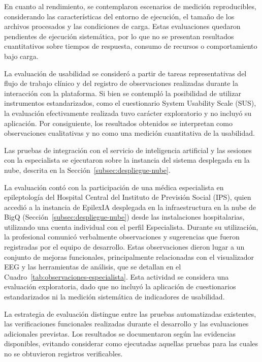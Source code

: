 En cuanto al rendimiento, se contemplaron escenarios de medición reproducibles, considerando las características del entorno de ejecución, el tamaño de los archivos procesados y las condiciones de carga. Estas evaluaciones quedaron pendientes de ejecución sistemática, por lo que no se presentan resultados cuantitativos sobre tiempos de respuesta, consumo de recursos o comportamiento bajo carga.


La evaluación de usabilidad se consideró a partir de tareas representativas del flujo de trabajo clínico y del registro de observaciones realizadas durante la interacción con la plataforma. Si bien se contempló la posibilidad de utilizar instrumentos estandarizados, como el cuestionario System Usability Scale (SUS), la evaluación efectivamente realizada tuvo carácter exploratorio y no incluyó su aplicación. Por consiguiente, los resultados obtenidos se interpretan como observaciones cualitativas y no como una medición cuantitativa de la usabilidad.


Las pruebas de integración con el servicio de inteligencia artificial y las sesiones con la especialista se ejecutaron sobre la instancia del sistema desplegada en la nube, descrita en la Sección~\ref{subsec:despliegue-nube}.

La evaluación contó con la participación de una médica especialista en epileptología del Hospital Central del Instituto de Previsión Social (IPS), quien accedió a la instancia de EpilexIA desplegada en la infraestructura en la nube de BigQ (Sección~\ref{subsec:despliegue-nube}) desde las instalaciones hospitalarias, utilizando una cuenta individual con el perfil Especialista. Durante su utilización, la profesional comunicó verbalmente observaciones y sugerencias que fueron registradas por el equipo de desarrollo. Estas observaciones dieron lugar a un conjunto de mejoras funcionales, principalmente relacionadas con el visualizador EEG y las herramientas de análisis, que se detallan en el Cuadro~\ref{tab:observaciones-especialista}. Esta actividad se considera una evaluación exploratoria, dado que no incluyó la aplicación de cuestionarios estandarizados ni la medición sistemática de indicadores de usabilidad.


La estrategia de evaluación distingue entre las pruebas automatizadas existentes, las verificaciones funcionales realizadas durante el desarrollo y las evaluaciones adicionales previstas. Los resultados se documentaron según las evidencias disponibles, evitando considerar como ejecutadas aquellas pruebas para las cuales no se obtuvieron registros verificables.


